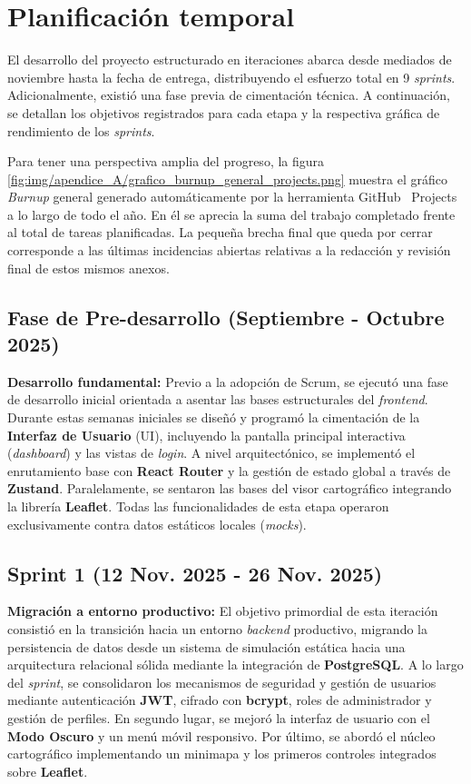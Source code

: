 \section{Planificación temporal}
El desarrollo del proyecto estructurado en iteraciones abarca desde mediados de noviembre hasta la fecha de entrega, distribuyendo el esfuerzo total en 9 \textit{sprints}. Adicionalmente, existió una fase previa de cimentación técnica. A continuación, se detallan los objetivos registrados para cada etapa y la respectiva gráfica de rendimiento de los \textit{sprints}.

Para tener una perspectiva amplia del progreso, la figura \ref{fig:img/apendice_A/grafico_burnup_general_projects.png} muestra el gráfico \textit{Burnup} general generado automáticamente por la herramienta GitHub~\cite{github} Projects a lo largo de todo el año. En él se aprecia la suma del trabajo completado frente al total de tareas planificadas. La pequeña brecha final que queda por cerrar corresponde a las últimas incidencias abiertas relativas a la redacción y revisión final de estos mismos anexos.


\subsection*{Fase de Pre-desarrollo (Septiembre - Octubre 2025)}
\textbf{Desarrollo fundamental:} Previo a la adopción de Scrum, se ejecutó una fase de desarrollo inicial orientada a asentar las bases estructurales del \textit{frontend}. Durante estas semanas iniciales se diseñó y programó la cimentación de la \textbf{Interfaz de Usuario} (UI), incluyendo la pantalla principal interactiva (\textit{dashboard}) y las vistas de \textit{login}. A nivel arquitectónico, se implementó el enrutamiento base con \textbf{React Router} y la gestión de estado global a través de \textbf{Zustand}. Paralelamente, se sentaron las bases del visor cartográfico integrando la librería \textbf{Leaflet}. Todas las funcionalidades de esta etapa operaron exclusivamente contra datos estáticos locales (\textit{mocks}).

\subsection{Sprint 1 (12 Nov. 2025 - 26 Nov. 2025)}
\textbf{Migración a entorno productivo:} El objetivo primordial de esta iteración consistió en la transición hacia un entorno \textit{backend} productivo, migrando la persistencia de datos desde un sistema de simulación estática hacia una arquitectura relacional sólida mediante la integración de \textbf{PostgreSQL}. A lo largo del \textit{sprint}, se consolidaron los mecanismos de seguridad y gestión de usuarios mediante autenticación \textbf{JWT}, cifrado con \textbf{bcrypt}, roles de administrador y gestión de perfiles. En segundo lugar, se mejoró la interfaz de usuario con el \textbf{Modo Oscuro} y un menú móvil responsivo. Por último, se abordó el núcleo cartográfico implementando un minimapa y los primeros controles integrados sobre \textbf{Leaflet}.

